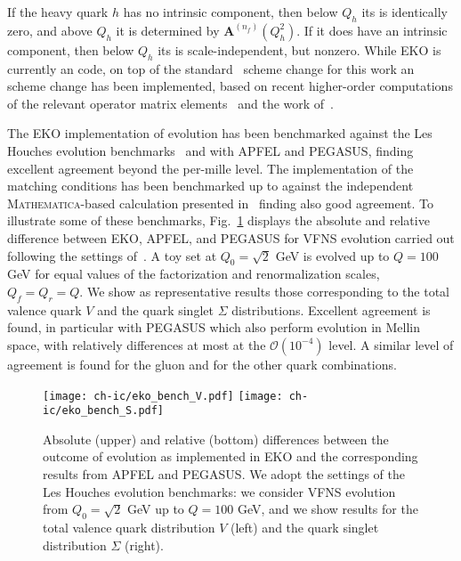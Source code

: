 If the heavy quark $h$ has no intrinsic component, then below $Q_h$
its \pdf is identically zero, and above $Q_h$ it is determined by
$\mathbf{A}^{(n_f)}(Q_{h}^2)$. If it does have an intrinsic
component, then  below $Q_h$ its \pdf is scale-independent, but nonzero.
While  \textsc{\small EKO} is currently an \nnlo code, on
top of the standard~\cite{pdfnnlo} \nnlo scheme change for this work
an \nnnlo scheme change has been implemented, based on recent higher-order computations
of the relevant operator matrix elements~\cite{Bierenbaum:2009zt,Bierenbaum:2009mv,Ablinger:2010ty,Ablinger:2014vwa,Ablinger:2014uka,Behring:2014eya,Blumlein:2017wxd,Ablinger_2014,Ablinger:2014nga}
and the work of~\cite{zanoli}.

The  \textsc{\small EKO} implementation of \qcd evolution has been
benchmarked against the Les Houches \pdf evolution
benchmarks~\cite{Dittmar:2005ed,Giele:2002hx} and with
\textsc{\small APFEL} and \textsc{\small PEGASUS},
finding excellent agreement beyond the per-mille level.
%
The implementation of the  matching conditions
has been benchmarked up to \nnnlo against the independent \textsc{\small Mathematica}-based calculation 
presented in~\cite{zanoli} finding also good agreement.
%
To illustrate some of these benchmarks, Fig.~\ref{fig:ic/EKObench} displays
the absolute and relative difference between \textsc{\small EKO},
\textsc{\small APFEL}, and \textsc{\small PEGASUS}
for \nnlo VFNS evolution
carried out
following the settings of~\cite{Dittmar:2005ed,Giele:2002hx}.
%
A toy \pdf set at $Q_0=\sqrt{2}$ GeV is evolved up to $Q=100$ GeV
for equal values of the factorization and renormalization scales, $Q_f=Q_r=Q$.
%
We show as representative results those corresponding to
the  total valence quark  $V$ 
and the quark singlet $\Sigma$ distributions.
%
Excellent agreement is found, in particular
with \textsc{\small PEGASUS} which also perform \qcd
evolution in Mellin space, with relatively differences
at most at the $\mathcal{O}\left( 10^{-4}\right)$ level.
%
A similar level of agreement is found
for the gluon and for the other quark \pdf combinations.

\begin{figure}[t]
    \begin{center}
        \texttt{[image: ch-ic/eko\_bench\_V.pdf]}
        \texttt{[image: ch-ic/eko\_bench\_S.pdf]}
        \caption{\small Absolute (upper) and relative (bottom) differences between 
        the outcome of \nnlo \qcd evolution
        as implemented in
        \textsc{\small EKO} and the
        corresponding results from \textsc{\small APFEL} and \textsc{\small PEGASUS}.
We adopt the settings of the Les Houches \pdf evolution benchmarks: we
consider  VFNS evolution from $Q_0=\sqrt{2}$ GeV up to $Q=100$ GeV,
and we show  results for the total valence quark distribution $V$ (left)
and the quark singlet distribution $\Sigma$ (right).
      \label{fig:ic/EKObench} }
    \end{center}
\end{figure}
